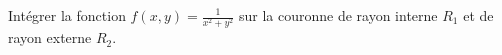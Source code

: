 
\begin{exercice}\label{exoOutilsMath-0092}

    Intégrer la fonction $f(x,y)=\frac{1}{ x^2+y^2 }$ sur la couronne de rayon interne $R_1$ et de rayon externe $R_2$.


\end{exercice}
